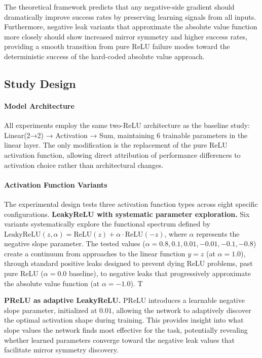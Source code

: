 The theoretical framework predicts that any negative-side gradient should dramatically improve success rates by preserving learning signals from all inputs. Furthermore, negative leak variants that approximate the absolute value function more closely should show increased mirror symmetry and higher success rates, providing a smooth transition from pure ReLU failure modes toward the deterministic success of the hard-coded absolute value approach.


\subsection*{Study Design}

\paragraph{Model Architecture}
All experiments employ the same two-ReLU architecture as the baseline study: Linear(2→2) → Activation → Sum, maintaining 6 trainable parameters in the linear layer. The only modification is the replacement of the pure ReLU activation function, allowing direct attribution of performance differences to activation choice rather than architectural changes.

\paragraph{Activation Function Variants}
The experimental design tests three activation function types across eight specific configurations. \textbf{LeakyReLU with systematic parameter exploration.} Six variants systematically explore the functional spectrum defined by $\text{LeakyReLU}(z, \alpha) = \text{ReLU}(z) + \alpha \cdot \text{ReLU}(-z)$, where $\alpha$ represents the negative slope parameter. The tested values ($\alpha = 0.8, 0.1, 0.01, -0.01, -0.1, -0.8$) create a continuum from approaches to the linear function $y = z$ (at $\alpha = 1.0$), through standard positive leaks designed to prevent dying ReLU problems, past pure ReLU ($\alpha = 0.0$ baseline), to negative leaks that progressively approximate the absolute value function (at $\alpha = -1.0$). T

\textbf{PReLU as adaptive LeakyReLU.} PReLU introduces a learnable negative slope parameter, initialized at $0.01$, allowing the network to adaptively discover the optimal activation shape during training. This provides insight into what slope values the network finds most effective for the task, potentially revealing whether learned parameters converge toward the negative leak values that facilitate mirror symmetry discovery.

